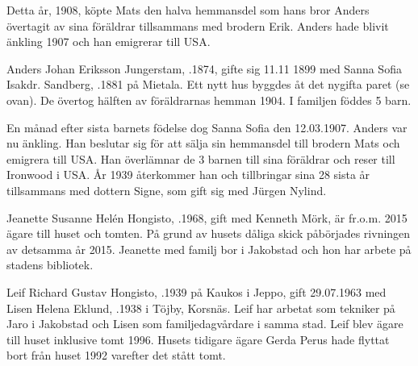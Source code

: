 Detta år, 1908, köpte Mats den halva hemmansdel som hans bror Anders övertagit av sina föräldrar tillsammans med brodern Erik. Anders hade blivit änkling 1907 och han emigrerar till USA.


%
Anders Johan Eriksson Jungerstam, .1874, gifte sig 11.11 1899 med Sanna Sofia Isakdr. Sandberg, .1881 på Mietala. Ett nytt hus byggdes åt det nygifta paret (se ovan). De övertog hälften av föräldrarnas hemman 1904. I familjen föddes 5 barn.
\begin{jhchildren}
  \item {}
  \item {}
  \item {}
  \item {}
  \item {}
\end{jhchildren}
En månad efter sista barnets födelse dog Sanna Sofia den 12.03.1907. Anders var nu änkling. Han beslutar sig för att sälja sin hemmansdel till brodern Mats och emigrera till USA. Han överlämnar de 3 barnen till sina föräldrar och reser till Ironwood i USA. År 1939 återkommer han och tillbringar sina 28 sista år tillsammans med dottern Signe, som gift sig med Jürgen Nylind.



%


%
Jeanette Susanne Helén Hongisto, .1968, gift med Kenneth Mörk, är fr.o.m. 2015 ägare till huset och tomten. På grund av husets dåliga skick påbörjades rivningen av detsamma år 2015. Jeanette med familj bor i Jakobstad och hon har arbete på stadens bibliotek.


%
Leif Richard Gustav Hongisto, .1939 på Kaukos i Jeppo, gift 29.07.1963 med Lisen Helena Eklund, .1938 i Töjby, Korsnäs. Leif har arbetat som tekniker på Jaro i Jakobstad och Lisen som familjedagvårdare i samma stad. Leif blev ägare till  huset inklusive tomt 1996. Husets tidigare ägare Gerda Perus hade flyttat bort från huset 1992 varefter det stått tomt.

